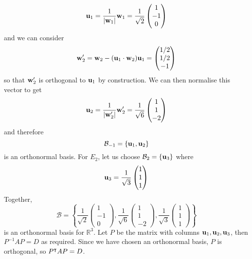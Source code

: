 \begin{enumerate}[(i)]
	      \[ \vb u_1 = \frac{1}{\abs{\vb w_1}}\vb w_1 = \frac{1}{\sqrt 2}\begin{pmatrix}
			      1 \\ -1 \\ 0
		      \end{pmatrix} \]
	      and we can consider
	      \[ \vb w_2' = \vb w_2 - (\vb u_1 \cdot \vb w_2)\vb u_1 = \begin{pmatrix}
			      1/2 \\ 1/2 \\ -1
		      \end{pmatrix} \]
	      so that $\vb w_2'$ is orthogonal to $\vb u_1$ by construction. We can then normalise this vector to get
	      \[ \vb u_2 = \frac{1}{\abs{\vb w_2'}}\vb w_2' = \frac{1}{\sqrt 6} \begin{pmatrix}
			      1 \\ 1 \\ -2
		      \end{pmatrix} \]
	      and therefore
	      \[ \mathcal B_{-1} = \{ \vb u_1, \vb u_2 \} \]
	      is an orthonormal basis. For $E_2$, let us choose $\mathcal B_2 = \{ \vb u_3 \}$ where
	      \[ \vb u_3 = \frac{1}{\sqrt 3}\begin{pmatrix}
			      1 \\ 1 \\ 1
		      \end{pmatrix} \]
	      Together,
	      \[ \mathcal B = \left\{ \frac{1}{\sqrt 2}\begin{pmatrix}
			      1 \\ -1 \\ 0
		      \end{pmatrix}, \frac{1}{\sqrt 6} \begin{pmatrix}
			      1 \\ 1 \\ -2
		      \end{pmatrix}, \frac{1}{\sqrt 3}\begin{pmatrix}
			      1 \\ 1 \\ 1
		      \end{pmatrix} \right\} \]
	      is an orthonormal basis for $\mathbb R^3$. Let $P$ be the matrix with columns $\vb u_1, \vb u_2, \vb u_3$, then $P^{-1}AP = D$ as required. Since we have chosen an orthonormal basis, $P$ is orthogonal, so $P^\intercal AP = D$.
\end{enumerate}

